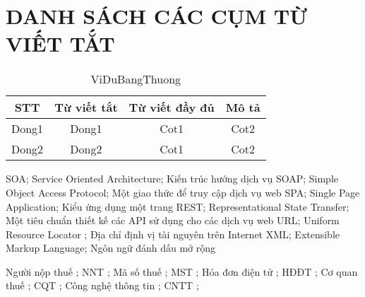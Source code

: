 \newpage
\section*{\centering DANH SÁCH CÁC CỤM TỪ VIẾT TẮT}


\begin{table}[h]
\centering
\begin{tabular}{|c|c|c|c|}
\hline
STT & Từ viết tắt & Từ viết đầy đủ & Mô tả \\
\hline
Dong1 & Dong1 & Cot1 & Cot2 \\
\hline
Dong2 & Dong2 & Cot1 & Cot2 \\
\hline
\end{tabular}
\caption{ViDuBangThuong}
\end{table}

\newpage


SOA; Service Oriented Architecture; Kiến trúc hướng dịch vụ
SOAP; Simple Object Access Protocol; Một giao thức để truy cập dịch vụ web
SPA; Single Page Application; Kiểu ứng dụng một trang
REST; Representational State Transfer; Một tiêu chuẩn thiết kế các API sử dụng cho các dịch vụ web
URL; Uniform Resource Locator ; Địa chỉ định vị tài nguyên trên Internet
XML; Extensible Markup Language; Ngôn ngữ đánh dấu mở rộng

Người nộp thuế ; NNT ;
Mã số thuế ; MST ;
Hóa đơn điện tử ; HĐĐT ;
Cơ quan thuế ; CQT ;
Công nghệ thông tin ; CNTT ;

